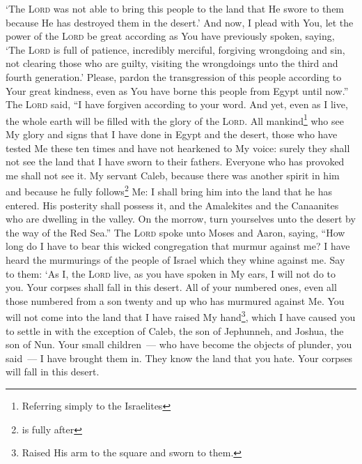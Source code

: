 \begin{enumerate*}[mode=unboxed]
     `The \textsc{Lord} was not able to bring this people to the land that He swore to them because He has destroyed them in the desert.'%
     And now, I plead with You, let the power of the \textsc{Lord} be great according as You have previously spoken, saying,%
     `The \textsc{Lord} is full of patience, incredibly merciful, forgiving wrongdoing and sin, not clearing those who are guilty, visiting the wrongdoings unto the third and fourth generation.'%
     Please, pardon the transgression of this people according to Your great kindness, even as You have borne this people from Egypt until now.''%
     The \textsc{Lord} said, ``I have forgiven according to your word.%
     And yet, even as I live, the whole earth will be filled with the glory of the \textsc{Lord}.%
     All mankind\footnote{Referring simply to the Israelites} who see My glory and signs that I have done in Egypt and the desert, those who have tested Me these ten times and have not hearkened to My voice:%
     surely they shall not see the land that I have sworn to their fathers. Everyone who has provoked me shall not see it.%
     My servant Caleb, because there was another spirit in him and because he fully follows\footnote{is fully after} Me: I shall bring him into the land that he has entered. His posterity shall possess it,%
     and the Amalekites and the Canaanites who are dwelling in the valley. On the morrow, turn yourselves unto the desert by the way of the Red Sea.''%
     The \textsc{Lord} spoke unto Moses and Aaron, saying,%
     ``How long do I have to bear this wicked congregation that murmur against me? I have heard the murmurings of the people of Israel which they whine against me.%
     Say to them: `As I, the \textsc{Lord} live, as you have spoken in My ears, I will not do to you.%
     Your corpses shall fall in this desert. All of your numbered ones, even all those numbered from a son twenty and up who has murmured against Me.%
     You will not come into the land that I have raised My hand\footnote{Raised His arm to the square and sworn to them.}, which I have caused you to settle in with the exception of Caleb, the son of Jephunneh, and Joshua, the son of Nun.%
     Your small children~--- who have become the objects of plunder, you said~--- I have brought them in. They know the land that you hate.%
     Your corpses will fall in this desert.%

\end{enumerate*}
